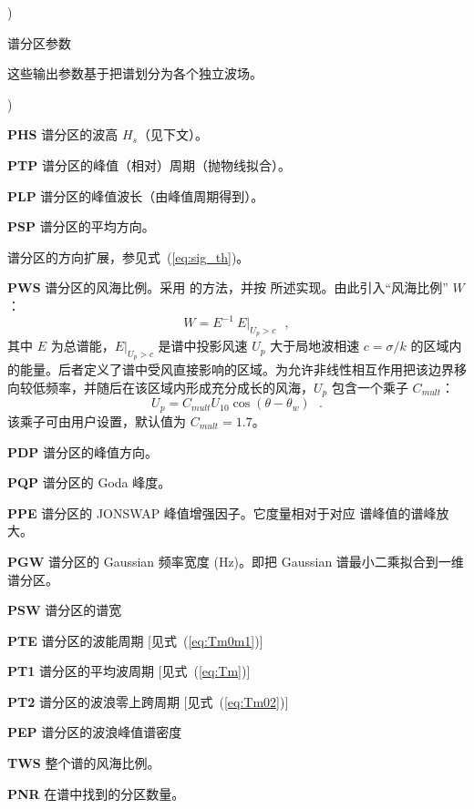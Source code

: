 \begin{list}{)\hfill}
\item{谱分区参数} \label{out:spec_part}

这些输出参数基于把谱划分为各个独立波场。

\begin{list}{)\hfill}
            { \leftmargin 8mm 
             \rightmargin 5mm \itemsep 0mm \parsep 0mm}


\item \textbf{PHS} 谱分区的波高 $H_s$（见下文）。\label{out:first_part}
\item \textbf{PTP} 谱分区的峰值（相对）周期（抛物线拟合）。
\item \textbf{PLP} 谱分区的峰值波长（由峰值周期得到）。
\item \textbf{PSP} 谱分区的平均方向。
\item 谱分区的方向扩展，参见式~(\ref{eq:sig_th})。
\item \textbf{PWS} 谱分区的风海比例。采用 \cite{art:HP01} 的方法，并按 \cite{tol:Oahu07a} 所述实现。由此引入“风海比例” $W$：
\begin{equation}
W = E^{-1}  \: E |_{U_p > c}  \:\:\: , \label{eq:wsf}
\end{equation}
其中 $E$ 为总谱能，$E |_{U_p > c}$ 是谱中投影风速 $U_p$ 大于局地波相速 $c = \sigma / k$ 的区域内的能量。后者定义了谱中受风直接影响的区域。为允许非线性相互作用把该边界移向较低频率，并随后在该区域内形成充分成长的风海，$U_p$ 包含一个乘子 $C_{mult}$：
\begin{equation}
U_p = C_{mult} U_{10} \cos ( \theta - \theta_w )  \:\:\: . \label{eq:Up}
\end{equation}
该乘子可由用户设置，默认值为 $C_{mult} = 1.7$。
\item \textbf{PDP} 谱分区的峰值方向。
\item \textbf{PQP} 谱分区的 Goda 峰度。
\item \textbf{PPE} 谱分区的 JONSWAP 峰值增强因子。它度量相对于对应 \citeauthor{art:PM64} 谱峰值的谱峰放大。
\item \textbf{PGW} 谱分区的 Gaussian 频率宽度 (Hz)。即把 Gaussian 谱最小二乘拟合到一维谱分区。
\item \textbf{PSW} 谱分区的谱宽 \citep{art:LH84}
\item \textbf{PTE} 谱分区的波能周期 [见式~(\ref{eq:Tm0m1})]
\item \textbf{PT1} 谱分区的平均波周期 [见式~(\ref{eq:Tm})]
\item \textbf{PT2} 谱分区的波浪零上跨周期 [见式~(\ref{eq:Tm02})]
\item \textbf{PEP} 谱分区的波浪峰值谱密度
\item \textbf{TWS} 整个谱的风海比例。
\item \textbf{PNR} 在谱中找到的分区数量。\label{out:last_part}
\end{list}



\end{list}
